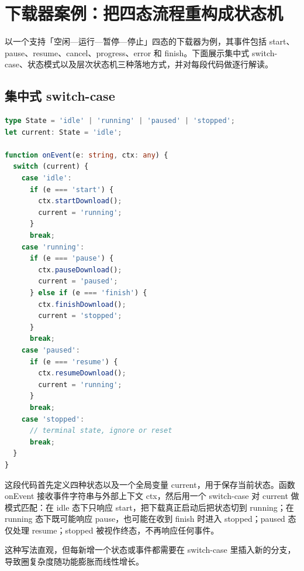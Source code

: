 \chapter{下载器案例：把四态流程重构成状态机}
以一个支持「空闲—运行—暂停—停止」四态的下载器为例，其事件包括 start、pause、resume、cancel、progress、error 和 finish。下面展示集中式 switch-case、状态模式以及层次状态机三种落地方式，并对每段代码做逐行解读。\par
\section{集中式 switch-case}
\begin{lstlisting}[language=ts]
type State = 'idle' | 'running' | 'paused' | 'stopped';
let current: State = 'idle';

function onEvent(e: string, ctx: any) {
  switch (current) {
    case 'idle':
      if (e === 'start') {
        ctx.startDownload();
        current = 'running';
      }
      break;
    case 'running':
      if (e === 'pause') {
        ctx.pauseDownload();
        current = 'paused';
      } else if (e === 'finish') {
        ctx.finishDownload();
        current = 'stopped';
      }
      break;
    case 'paused':
      if (e === 'resume') {
        ctx.resumeDownload();
        current = 'running';
      }
      break;
    case 'stopped':
      // terminal state, ignore or reset
      break;
  }
}
\end{lstlisting}
这段代码首先定义四种状态以及一个全局变量 current，用于保存当前状态。函数 onEvent 接收事件字符串与外部上下文 ctx，然后用一个 switch-case 对 current 做模式匹配：在 idle 态下只响应 start，把下载真正启动后把状态切到 running；在 running 态下既可能响应 pause，也可能在收到 finish 时进入 stopped；paused 态仅处理 resume；stopped 被视作终态，不再响应任何事件。\par
这种写法直观，但每新增一个状态或事件都需要在 switch-case 里插入新的分支，导致圈复杂度随功能膨胀而线性增长。\par
